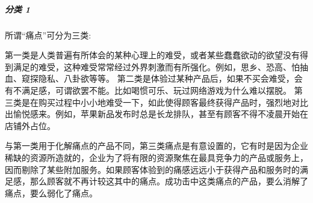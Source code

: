 \documentclass[letterpaper,11pt,english]{sphinxmanual}
\begin{document}
\subparagraph{分类 1\sphinxfootnotemark[303]}
\label{\detokenize{chapter_introduction/opportunity:id5}}%
\begin{footnotetext}[303]\sphinxAtStartFootnote
{}
%
\end{footnotetext}\ignorespaces 
所谓“痛点”可分为三类:

第一类是人类普遍有所体会的某种心理上的难受，或者某些蠢蠢欲动的欲望没有得到满足的难受，这种难受常常经过外界刺激而有所强化。例如，思乡、恐高、怕抽血、窥探隐私、八卦欲等等。
第二类是体验过某种产品后，如果不买会难受，会有不满足感，可谓欲罢不能。比如喝惯可乐、玩过网络游戏为什么难以摆脱。
第三类是在购买过程中小小地难受一下，如此使得顾客最终获得产品时，强烈地对比出愉悦感来。例如，苹果新品发布时总是长龙排队，甚至有顾客不得不凌晨开始在店铺外占位。

与第一类用于化解痛点的产品不同，第三类痛点是有意设置的，它有时是因为企业稀缺的资源所造就的，企业为了将有限的资源聚焦在最具竞争力的产品或服务上，因而剔除了某些附加服务。如果顾客体验到的痛感远远小于获得产品和服务时的满足感，那么顾客就不再计较这其中的痛点。成功击中这类痛点的产品，要么消解了痛点，要么弱化了痛点。
\end{document}
